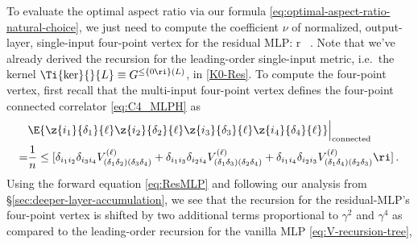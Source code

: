 To evaluate 
the optimal aspect ratio via our formula \eqref{eq:optimal-aspect-ratio-natural-choice}, 
we just need to compute the coefficient $\nu$ of normalized, output-layer, single-input four-point vertex 
for the residual MLP:
\be\label{eq:scaling-solution-reprinted-for-MIT-reprint}
 \equiv \nu r \, .
\ee
Note that we've already derived the recursion for the leading-order single-input metric, i.e.~the kernel $\Ti{\ker}{}{L}\equiv G_{}^{\le\{0\ri\}(L)}$, in \eqref{K0-Res}. To compute the four-point vertex, first recall that the multi-input four-point vertex
defines the four-point connected correlator \eqref{eq:C4_MLPH} as
\begin{align}\label{eq:C4_MLPRes}
&\E{\z{i_1}{\delta_1}{\ell}\z{i_2}{\delta_2}{\ell}\z{i_3}{\delta_3}{\ell}\z{i_4}{\delta_4}{\ell}}\Big\vert_{\text{connected}}\, \\
=&\frac{1}{n}\le[\delta_{i_1i_2}\delta_{i_3 i_4}V^{(\ell)}_{(\delta_1\delta_2)(\delta_3\delta_4)}+\delta_{i_1i_3}\delta_{i_2 i_4}V^{(\ell)}_{(\delta_1\delta_3)(\delta_2\delta_4)}+\delta_{i_1i_4}\delta_{i_2 i_3}V^{(\ell)}_{(\delta_1\delta_4)(\delta_2\delta_3)} \ri]\, .\nonumber
\end{align}
Using the forward equation \eqref{eq:ResMLP} and following our analysis from \S\ref{sec:deeper-layer-accumulation}, we see that
the recursion for the residual-MLP's four-point vertex is shifted by two additional terms proportional to $\gamma^2$ and $\gamma^4$ as compared to the leading-order recursion for the vanilla MLP \eqref{eq:V-recursion-tree},
